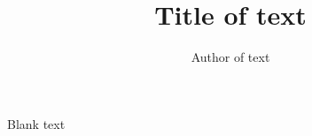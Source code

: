 \documentclass{scrartcl} %
\title{Title of text}
\author{Author of text}
\date{} %
\begin{document}
\begin{titlepage}

\maketitle

\thispagestyle{empty}

\end{titlepage}

\newpage

\tableofcontents

\newpage



Blank text
\end{document}
